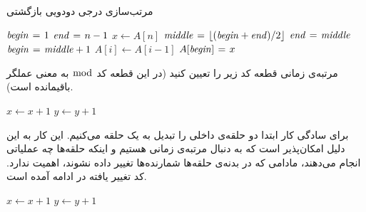 {\begin{algorithm}
\caption{مرتب‌سازی درجی دودویی بازگشتی}\label{ch1:alg:recurBinInsSort}
\begin{latin}
\begin{algorithmic}[1]
				\State	\Return
		\Else
				\State	{}
				\State	$\mathit{begin} \mathrel{\hspace{1pt}=\hspace{1pt}} 1$		
				\State	$\mathit{end} \mathrel{\hspace{1pt}=\hspace{1pt}} n-1$		
%
				\State	$x \gets A[n]$
						\State	$\mathit{middle} \mathrel{\hspace{1pt}=\hspace{1pt}} \lfloor (\mathit{begin} + \mathit{end}) /2 \rfloor$
								\State	$\mathit{end} \mathrel{\hspace{1pt}=\hspace{1pt}} \mathit{middle}$						
						\Else
								\State	$\mathit{begin} \mathrel{\hspace{1pt}=\hspace{1pt}} \mathit{middle} + 1$		
						\EndIf
				\EndWhile
						\State	$A[i] \gets A[i-1]$
				\EndFor
				\State	$A[\mathit{begin}] \mathrel{\hspace{1pt}=\hspace{1pt}} x$				
		\EndIf
\EndProcedure
\end{algorithmic}
\end{latin}
\end{algorithm}

 مرتبه‌ی زمانی قطعه کد زیر را تعیین کنید (در این قطعه کد {$\bmod$} به معنی عملگر باقیمانده است).

\begin{latin}
\begin{algorithmic}[1]
								\State	$x \gets x+1$
						\EndFor
								\State	$y \gets y+1$							
						\EndFor
				\EndIf
		\EndFor
\end{algorithmic}
\end{latin}


برای سادگی کار ابتدا دو حلقه‌‌ی داخلی را تبدیل به یک حلقه می‌کنیم. این کار به این دلیل امکان‌پذیر است که به دنبال مرتبه‌ی زمانی هستیم و اینکه حلقه‌ها چه عملیاتی انجام می‌دهند، مادامی که در بدنه‌ی حلقه‌ها شمارنده‌ها تغییر داده نشوند، اهمیت ندارد. کد تغییر یافته در ادامه آمده است.

\begin{latin}
\begin{algorithmic}[1]
								\State	$x \gets x+1$
								\State	$y \gets y+1$		
						\EndFor
				\EndIf
		\EndFor
\end{algorithmic}
\end{latin}

}
